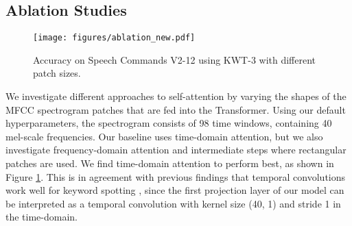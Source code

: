 \documentclass[a4paper]{article}
\begin{document}
\begin{table}[t]
\footnotesize
  \caption{Accuracy on Speech Commands V1 \cite{speechv1} and V2 \cite{speechv2}.}
  \label{tab:results}
  \centering
\end{table}

\subsection{Ablation Studies}

\begin{figure}[b]
  \centering
  \texttt{[image: figures/ablation\_new.pdf]}
  \caption{Accuracy on Speech Commands V2-12 using KWT-3 with different patch sizes.}
  \label{fig:ablation}
\end{figure}

We investigate different approaches to self-attention by varying the shapes of the MFCC spectrogram patches that are fed into the Transformer. Using our default hyperparameters, the spectrogram consists of 98 time windows, containing 40 mel-scale frequencies. Our baseline uses time-domain attention, but we also investigate frequency-domain attention and intermediate steps where rectangular patches are used. We find time-domain attention to perform best, as shown in Figure \ref{fig:ablation}. This is in agreement with previous findings that temporal convolutions work well for keyword spotting \cite{choi2019temporal}, since the first projection layer of our model can be interpreted as a temporal convolution with kernel size (40, 1) and stride 1 in the time-domain.
\end{document}
